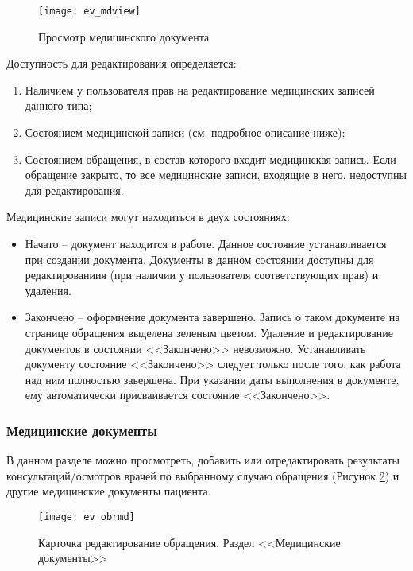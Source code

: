 { \begin{figure}[ht]\centering
   \texttt{[image: ev\_mdview]}
   \caption{Просмотр медицинского документа}
   \label{img_ev_mdview}
 \end{figure}

Доступность для редактирования определяется:
\begin{enumerate}
 \item Наличием у пользователя прав на редактирование медицинских записей данного типа;
 \item Состоянием медицинской записи (см. подробное описание ниже);
 \item Состоянием обращения, в состав которого входит медицинская запись. Если обращение закрыто, то все медицинские записи, входящие в него, недоступны для редактирования.  
\end{enumerate} 

Медицинские записи могут находиться в двух состояниях:
\begin{itemize}
 \item Начато -- документ находится в работе. Данное состояние устанавливается при создании документа. Документы в данном состоянии доступны для редактированиия (при наличии у пользователя соответствующих прав) и удаления. 
 \item Закончено -- оформнение документа завершено. Запись о таком документе на странице обращения выделена зеленым цветом. Удаление и редактирование документов в состоянии <<Закончено>> невозможно. Устанавливать документу состояние <<Закончено>>   следует только после того, как работа над ним полностью завершена. При указании даты выполнения в документе, ему автоматически присваивается состояние  <<Закончено>>. 
\end{itemize}


{
\subsubsection{Медицинские документы} \label{ev_obr_md}

В данном разделе можно просмотреть, добавить или отредактировать результаты консультаций\slash осмотров врачей по выбранному случаю обращения (Рисунок \ref{img_ev_obrmd}) и другие медицинские документы пациента.

\begin{figure}[ht]\centering
 \texttt{[image: ev\_obrmd]}
 \caption{Карточка редактирование обращения. Раздел <<Медицинские документы>>}
 \label{img_ev_obrmd}
\end{figure}
}{}

}
